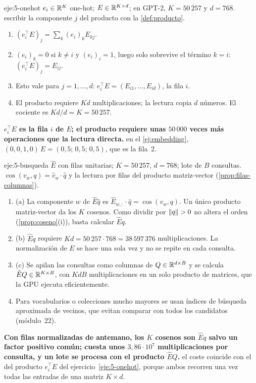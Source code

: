 \begin{solucion}{eje:5-onehot}
\datos $e_i\in\mathbb{R}^{K}$ one-hot; $E\in\mathbb{R}^{K\times d}$; en GPT-2, $K=50\,257$ y $d=768$.
\planteamiento escribir la componente $j$ del producto con la \cref{def:producto}.
\pasos
\begin{enumerate}[label=\arabic*.]
  \item $(e_i^{\top}E)_j=\sum_{k}(e_i)_kE_{kj}$.
  \item $(e_i)_k=0$ si $k\neq i$ y $(e_i)_i=1$, luego solo sobrevive el término $k=i$: $(e_i^{\top}E)_j=E_{ij}$.
  \item Esto vale para $j=1,\dots,d$: $e_i^{\top}E=(E_{i1},\dots,E_{id})$, la fila $i$.
  \item El producto requiere $Kd$ multiplicaciones; la lectura copia $d$ números. El cociente es $Kd/d=K=50\,257$.
\end{enumerate}
\resultado \textbf{$e_i^{\top}E$ es la fila $i$ de $E$; el producto requiere unas $50\,000$ veces más operaciones que la lectura directa.}
\comprobacion en el \cref{ej:embedding}, $(0,0,1,0)\,E=(0{,}5;\,0{,}5;\,0{,}5)$, que es la fila~2.
\end{solucion}

\begin{solucion}{eje:5-busqueda}
\datos $\hat E$ con filas unitarias; $K=50\,257$, $d=768$; lote de $B$ consultas.
\planteamiento $\cos(v_w,q)=\hat v_w\cdot\hat q$ y la lectura por filas del producto matriz-vector (\cref{prop:filas-columnas}).
\pasos
\begin{enumerate}[label=\arabic*.]
  \item (a) La componente $w$ de $\hat E\hat q$ es $\hat E_{w,:}\cdot\hat q=\cos(v_w,q)$. Un único producto matriz-vector da los $K$ cosenos. Como dividir por $\lVert q\rVert>0$ no altera el orden (\cref{prop:coseno}(i)), basta calcular $\hat Eq$.
  \item (b) $\hat Eq$ requiere $Kd=50\,257\cdot 768=38\,597\,376$ multiplicaciones. La normalización de $E$ se hace una sola vez y no se repite en cada consulta.
  \item (c) Se apilan las consultas como columnas de $Q\in\mathbb{R}^{d\times B}$ y se calcula $\hat EQ\in\mathbb{R}^{K\times B}$, con $KdB$ multiplicaciones en un solo producto de matrices, que la GPU ejecuta eficientemente.
  \item Para vocabularios o colecciones mucho mayores se usan índices de búsqueda aproximada de vecinos, que evitan comparar con todos los candidatos (módulo~22).
\end{enumerate}
\resultado \textbf{Con filas normalizadas de antemano, los $K$ cosenos son $\hat Eq$ salvo un factor positivo común; cuesta unos $3{,}86\cdot 10^{7}$ multiplicaciones por consulta, y un lote se procesa con el producto $\hat EQ$.}
\comprobacion el coste coincide con el del producto $e_i^{\top}E$ del ejercicio~\ref{eje:5-onehot}, porque ambos recorren una vez todas las entradas de una matriz $K\times d$.
\end{solucion}

